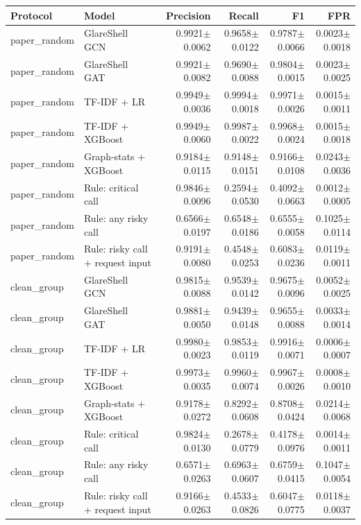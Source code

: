 \begin{tabular}{@{}llrrrr@{}}
\toprule
Protocol & Model & Precision & Recall & F1 & FPR \\ \midrule
paper\_random & GlareShell GCN & 0.9921$\pm$0.0062 & 0.9658$\pm$0.0122 & 0.9787$\pm$0.0066 & 0.0023$\pm$0.0018 \\
paper\_random & GlareShell GAT & 0.9921$\pm$0.0082 & 0.9690$\pm$0.0088 & 0.9804$\pm$0.0015 & 0.0023$\pm$0.0025 \\
paper\_random & TF-IDF + LR & 0.9949$\pm$0.0036 & 0.9994$\pm$0.0018 & 0.9971$\pm$0.0026 & 0.0015$\pm$0.0011 \\
paper\_random & TF-IDF + XGBoost & 0.9949$\pm$0.0060 & 0.9987$\pm$0.0022 & 0.9968$\pm$0.0024 & 0.0015$\pm$0.0018 \\
paper\_random & Graph-stats + XGBoost & 0.9184$\pm$0.0115 & 0.9148$\pm$0.0151 & 0.9166$\pm$0.0108 & 0.0243$\pm$0.0036 \\
paper\_random & Rule: critical call & 0.9846$\pm$0.0096 & 0.2594$\pm$0.0530 & 0.4092$\pm$0.0663 & 0.0012$\pm$0.0005 \\
paper\_random & Rule: any risky call & 0.6566$\pm$0.0197 & 0.6548$\pm$0.0186 & 0.6555$\pm$0.0058 & 0.1025$\pm$0.0114 \\
paper\_random & Rule: risky call + request input & 0.9191$\pm$0.0080 & 0.4548$\pm$0.0253 & 0.6083$\pm$0.0236 & 0.0119$\pm$0.0011 \\
clean\_group & GlareShell GCN & 0.9815$\pm$0.0088 & 0.9539$\pm$0.0142 & 0.9675$\pm$0.0096 & 0.0052$\pm$0.0025 \\
clean\_group & GlareShell GAT & 0.9881$\pm$0.0050 & 0.9439$\pm$0.0148 & 0.9655$\pm$0.0088 & 0.0033$\pm$0.0014 \\
clean\_group & TF-IDF + LR & 0.9980$\pm$0.0023 & 0.9853$\pm$0.0119 & 0.9916$\pm$0.0071 & 0.0006$\pm$0.0007 \\
clean\_group & TF-IDF + XGBoost & 0.9973$\pm$0.0035 & 0.9960$\pm$0.0074 & 0.9967$\pm$0.0026 & 0.0008$\pm$0.0010 \\
clean\_group & Graph-stats + XGBoost & 0.9178$\pm$0.0272 & 0.8292$\pm$0.0608 & 0.8708$\pm$0.0424 & 0.0214$\pm$0.0068 \\
clean\_group & Rule: critical call & 0.9824$\pm$0.0130 & 0.2678$\pm$0.0779 & 0.4178$\pm$0.0976 & 0.0014$\pm$0.0011 \\
clean\_group & Rule: any risky call & 0.6571$\pm$0.0263 & 0.6963$\pm$0.0607 & 0.6759$\pm$0.0415 & 0.1047$\pm$0.0054 \\
clean\_group & Rule: risky call + request input & 0.9166$\pm$0.0263 & 0.4533$\pm$0.0826 & 0.6047$\pm$0.0775 & 0.0118$\pm$0.0037 \\

\end{tabular}
